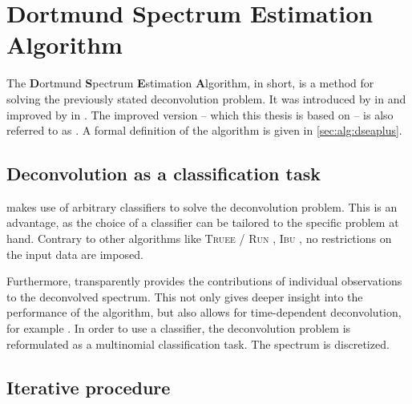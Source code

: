 \section{Dortmund Spectrum Estimation Algorithm} \label{sec:dsea:dsea}
The \textbf{D}ortmund \textbf{S}pectrum \textbf{E}stimation \textbf{A}lgorithm,
  \dsea{} in short, %
is a method for solving the previously stated deconvolution problem.
It was introduced by \citeauthor{dsea_tim} in \citeyear{dsea_tim} \cite{dsea_tim}
and improved by \citeauthor{dsea_mirko} in \citeyear{dsea_mirko} \cite{dsea_mirko}.
The improved version
  – which this thesis is based on –
is also referred to as \dseaplus{}.
%
A formal definition of the \dseaplus{} algorithm is given in \autoref{sec:alg:dseaplus}.


\subsection{Deconvolution as a classification task} %
\dsea{} makes use of arbitrary classifiers to solve the deconvolution problem.
This is an advantage,
  as the choice of a classifier can be tailored to the specific problem at hand.
Contrary to other algorithms like
  \textsc{Truee} / \textsc{Run} \cite{milke2013},
  \textsc{Ibu} \cite{dagostini1995, dagostini2010},
no restrictions on the input data are imposed.

Furthermore,
\dsea{} transparently provides the contributions of individual observations to the deconvolved spectrum.
This not only gives deeper insight into the performance of the algorithm,
but also allows for time-dependent deconvolution,
  for example \cite{dsea_mirko}. %
In order to use a classifier,
  the deconvolution problem is reformulated as a multinomial classification task.
The spectrum is discretized.


\subsection{Iterative procedure}
